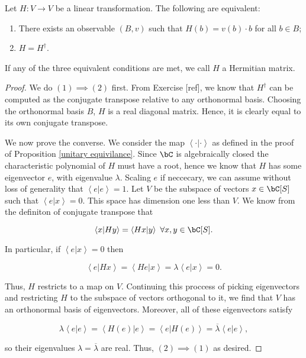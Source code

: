 \begin{prop}\label{Spectral theorem} Let $H: V\to V$ be a linear transformation. The following are equivalent:

\begin{enumerate}
\item There exists an observable $(B,v)$ such that $H(b)=v(b)\cdot b$ for all $b\in B$;
\item $H=H^{\dagger}$.
\end{enumerate}

If any of the three equivalent conditions are met, we call $H$ a Hermitian matrix.
\end{prop}
\begin{proof} We do $(1)\implies (2)$ first. From Exercise [ref], we know that $H^{\dagger}$ can be computed as the conjugate transpose relative to any orthonormal basis. Choosing the orthonormal basis $B$, $H$ is a real diagonal matrix. Hence, it is clearly equal to its own conjugate transpose.

We now prove the converse. We consider the map $\left<\cdot |\cdot \right>$ as defined in the proof of Proposition \ref{unitary equivilance}. Since $\bC$ is algebraically closed the characteristic polynomial of $H$ must have a root, hence we know that $H$ has some eigenvector $e$, with eigenvalue $\lambda$. Scaling $e$ if neccecary, we can assume without loss of generality that $\left<e | e\right> = 1$. Let $V$ be the subspace of vectors $x\in \bC[S]$ such that $\left<e | x\right>=0$. This space has dimension one less than $V$. We know from the definiton of conjugate transpose that

$$\left<x | Hy\right>=\left<Hx |y\right>\,\, \forall x,y\in \bC[S].$$

In particular, if $\left<e | x\right>=0$ then

$$\left< e | Hx \right>=\left<He | x \right>=\lambda \left< e| x \right>=0.$$

Thus, $H$ restricts to a map on $V$. Continuing this proccess of picking eigenvectors and restricting $H$ to the subspace of vectors orthogonal to it, we find that $V$ has an orthonormal basis of eigenvectors. Moreover, all of these eigenvectors satisfy

$$\lambda \left<e | e\right>=\left<H(e) | e\right>=\left<e | H(e)\right>=\overline{\lambda}\left<e | e\right>,$$

so their eigenvalues $\lambda=\overline{\lambda}$ are real. Thus, $(2)\implies (1)$ as desired.
\end{proof}


